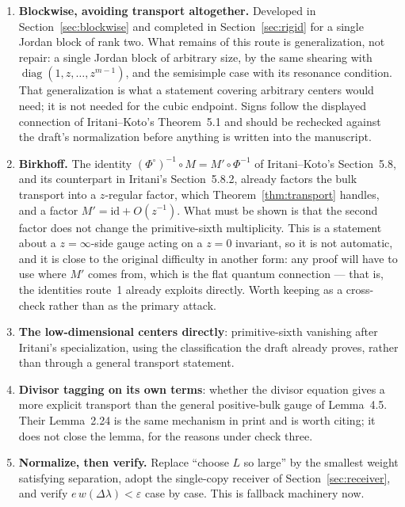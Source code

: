 \documentclass[11pt]{article}
\theoremstyle{definition}
\theoremstyle{remark}
\begin{document}
\begin{enumerate}
\item \textbf{Blockwise, avoiding transport altogether.} Developed in
  Section~\ref{sec:blockwise} and completed in Section~\ref{sec:rigid} for a
  single Jordan block of rank two. What remains of this route is generalization,
  not repair: a single Jordan block of arbitrary size, by the same shearing with
  $\operatorname{diag}(1,z,\dots,z^{m-1})$, and the semisimple case with its
  resonance condition. That generalization is what a statement covering
  arbitrary centers would need; it is not needed for the cubic endpoint.
  Signs follow the displayed connection of Iritani--Koto's Theorem~5.1 and
  should be rechecked against the draft's normalization before anything is
  written into the manuscript.
\item \textbf{Birkhoff.} The identity $(\Phi^\circ)^{-1}\circ M=M'\circ\Phi^{-1}$
  of Iritani--Koto's Section~5.8, and its counterpart in Iritani's
  Section~5.8.2, already factors the bulk transport into a $z$-regular factor,
  which Theorem~\ref{thm:transport} handles, and a factor
  $M'=\mathrm{id}+O(z^{-1})$. What must be shown is that the second factor does
  not change the primitive-sixth multiplicity. This is a statement about a
  $z=\infty$-side gauge acting on a $z=0$ invariant, so it is not automatic, and
  it is close to the original difficulty in another form: any proof will have to
  use where $M'$ comes from, which is the flat quantum connection --- that is,
  the identities route~1 already exploits directly. Worth keeping as a
  cross-check rather than as the primary attack.
\item \textbf{The low-dimensional centers directly}: primitive-sixth vanishing
  after Iritani's specialization, using the classification the draft already
  proves, rather than through a general transport statement.
\item \textbf{Divisor tagging on its own terms}: whether the divisor equation
  gives a more explicit transport than the general positive-bulk gauge of
  Lemma~4.5. Their Lemma~2.24 is the same mechanism in print and is worth
  citing; it does not close the lemma, for the reasons under check three.
\item \textbf{Normalize, then verify.} Replace ``choose $L$ so large'' by the
  smallest weight satisfying separation, adopt the single-copy receiver of
  Section~\ref{sec:receiver}, and verify $e\,w(\Delta\lambda)<\varepsilon$ case
  by case. This is fallback machinery now.
\end{enumerate}
\end{document}
